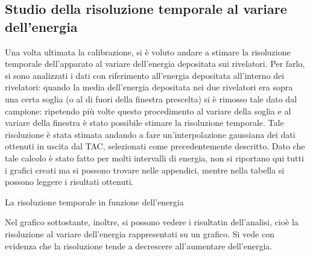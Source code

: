 \subsection{Studio della risoluzione temporale al variare dell'energia}

Una volta ultimata la calibrazione, si è voluto andare a stimare la risoluzione temporale dell'apparato al variare dell'energia depositata sui
rivelatori. Per farlo, si sono analizzati i dati con riferimento all'energia depositata all'interno dei rivelatori: quando la media dell'energia
depositata nei due rivelatori era sopra una certa soglia (o al di fuori della finestra prescelta) si è rimosso tale dato dal campione: ripetendo più
volte questo procedimento al variare della soglia e al variare della finestra è stato possibile stimare la risoluzione temporale. Tale
risoluzione è stata stimata andando a fare un'interpolazione gaussiana dei dati ottenuti in uscita dal TAC, selezionati come precedentemente descritto.
Dato che tale calcolo è stato fatto per molti intervalli di energia, non si riportano qui tutti i grafici creati ma si possono trovare nelle appendici,
mentre nella tabella si possono leggere i risultati ottenuti.
%
\begin{tabella}
	\centering
	
	\caption{La risoluzione temporale in funzione dell'energia}
	\label{tab:01tab1}
\end{tabella}
%
Nel grafico sottostante, inoltre, si possono vedere i risultatin dell'analisi, cioè la risoluzione al variare dell'energia rappresentati su un grafico. Si
vede con evidenza che la risoluzione tende a decrescere all'aumentare dell'energia.
\\
